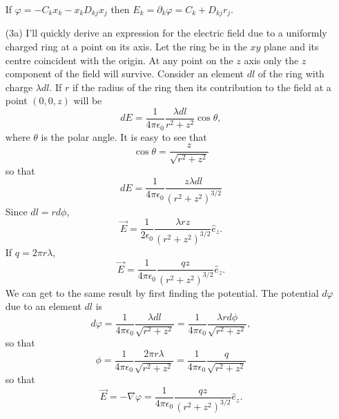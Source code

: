 \documentclass{article}
\newcommand{\uv}[1]{\hat{e}_{#1}}
\newcommand{\grad}[1]{\nabla{#1}}
\newcommand{\ke}{\frac{1}{4\pi\epsilon_0}}
\begin{document}
\begin{enumerate}
If $\varphi = -C_kx_k - x_kD_{kj}x_j$ then $E_k = \partial_k\varphi = C_k + D_{kj}r_j$.

\item[(3a)] I'll quickly derive an expression for the electric field due to a
uniformly charged ring at a point on its axis. Let the ring be in the $xy$ plane
and its centre coincident with the origin. At any point on the $z$ axis only the
$z$ component of the field will survive. Consider an element $dl$ of the ring
with charge $\lambda dl$. If $r$ if the radius of the ring then its contribution
to the field at a point $(0, 0, z)$ will be
\[
dE = \ke\frac{\lambda dl}{r^2 + z^2}\cos\theta,
\]
where $\theta$ is the polar angle. It is easy to see that 
\[
\cos\theta = \frac{z}{\sqrt{r^2 + z^2}}
\]
so that
\[
dE = \ke\frac{z\lambda dl}{(r^2 + z^2)^{3/2}}
\]
Since $dl = rd\phi$,
\begin{equation}\label{e2}
\vec{E} = \frac{1}{2\epsilon_0}\frac{\lambda rz}{(r^2 + z^2)^{3/2}}\uv{z}.
\end{equation}
If $q = 2\pi r \lambda$,
\begin{equation}\label{e3}
\vec{E} = \ke\frac{qz}{(r^2 + z^2)^{3/2}}\uv{z}.
\end{equation}
We can get to the same result by first finding the potential. The potential
$d\varphi$ due to an element $dl$ is
\[
d\varphi = \ke\frac{\lambda dl}{\sqrt{r^2 + z^2}} = \ke\frac{\lambda r d\phi}{\sqrt{r^2 + z^2}},
\]
so that
\begin{equation}\label{e4}
\phi = \ke \frac{2\pi r\lambda }{\sqrt{r^2 + z^2}} = \ke \frac{q}{\sqrt{r^2 + z^2}}
\end{equation}
so that
\[
\vec{E} = -\grad\varphi = \ke\frac{qz}{(r^2 + z^2)^{3/2}}\uv{z}.
\]


\end{enumerate}
\end{document}
